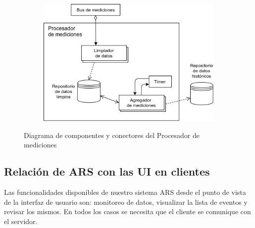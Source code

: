 \begin{figure}[H]
  \begin{subfigure}{\textwidth}
    \includegraphics[width=\textwidth]{imagenes/diagramas/procesadorDeMediciones.png}
  \end{subfigure}
  \caption{Diagrama de componentes y conectores del Procesador de mediciones}
  \label{fig:proc_med}
\end{figure}



\subsection{Relación de ARS con las UI en clientes}

\par Las funcionalidades disponibles de nuestro sistema ARS desde el punto de vista de la interfaz de usuario son: monitoreo de datos, visualizar la lista de eventos y revisar los mismos. En todos los casos se necesita que el cliente se comunique con el servidor.

